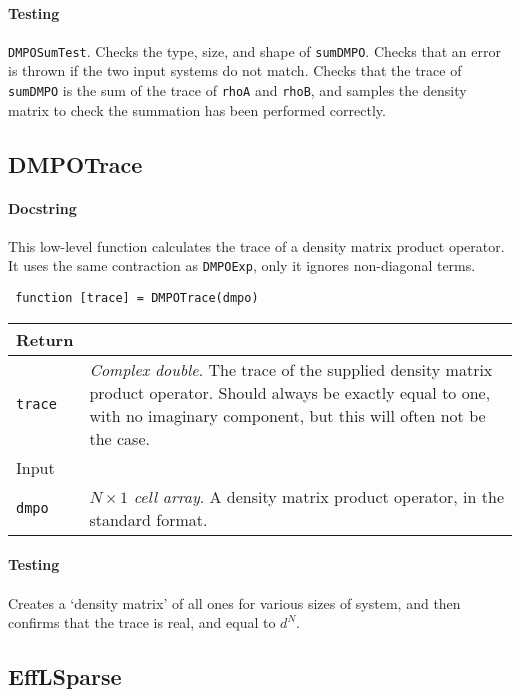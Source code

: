  \paragraph{Testing} \lstinline$DMPOSumTest$. Checks the type, size, and shape of \lstinline$sumDMPO$. Checks that an error is thrown if the two input systems do not match. Checks that the trace of \lstinline$sumDMPO$ is the sum of the trace of \lstinline$rhoA$ and \lstinline$rhoB$, and samples the density matrix to check the summation has been performed correctly.  

 \subsection{DMPOTrace}
 \paragraph{Docstring} This low-level function calculates the trace of a density matrix product operator. It uses the same contraction as \lstinline$DMPOExp$, only it ignores non-diagonal terms. 
 \begin{lstlisting}
 function [trace] = DMPOTrace(dmpo) \end{lstlisting}
 \begin{longtabu}{X[1,l]X[4,l]}
 \hline
 Return & \\ \hline
 \lstinline$trace$ & \emph{Complex double}. The trace of the supplied density matrix product operator. Should always be exactly equal to one, with no imaginary component, but this will often not be the case. \\ \hline
 Input & \\ \hline
 \lstinline$dmpo$ & \emph{\(N \times 1\) cell array}. A density matrix product operator, in the standard format. \\
 \hline
 \end{longtabu}
 \paragraph{Testing} Creates a `density matrix' of all ones for various sizes of system, and then confirms that the trace is real, and equal to \(d^{N}\). 

 \subsection{EffLSparse}
